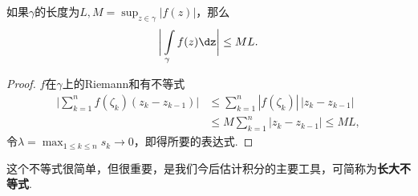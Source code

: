 \begin{prop}\label{prop3.1.6}
如果$\gamma$的长度为$L,M=\sup_{z\in\gamma}|f(z)|$，那么
\begin{equation}\label{eq3.1.4}
\bigg|\int\limits_\gamma f(z)\dz\bigg|\le ML.
\end{equation}
\end{prop}
\begin{proof}
  $f$在$\gamma$上的Riemann和有不等式
\begin{align*}
\bigg|\sum_{k=1}^nf(\zeta_k)(z_k-z_{k-1})\bigg|&
\le\sum_{k=1}^n|f(\zeta_k)|\,|z_k-z_{k-1}|\\
&\le M\sum_{k=1}^n|z_k-z_{k-1}|\le ML,
\end{align*}
令$\lambda=\max_{1\le k\le n}s_k\to0$，即得所要的表达式.
\end{proof}

这个不等式很简单，但很重要，是我们今后估计积分的主要工具，可简称为\textbf{长大不等式}.

